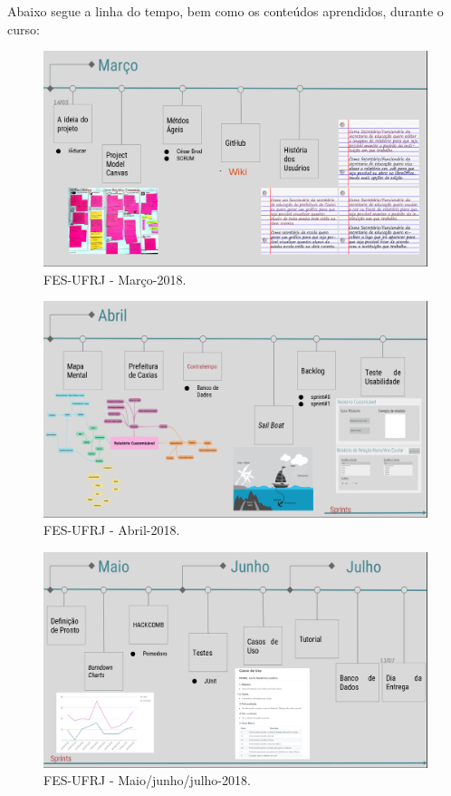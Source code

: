 Abaixo segue a linha do tempo, bem como os conteúdos aprendidos, durante o curso:

\begin{figure}
    \centering
    \includegraphics[width=.9\textwidth]{chaps/Images/Linha-tempo1.png}
    \caption{FES-UFRJ - Março-2018.}
    \label{fig:linha-dotempo1}
\end{figure}

\begin{figure}
    \centering
    \includegraphics[width=.9\textwidth]{chaps/Images/linha-tempo2.png}
    \caption{FES-UFRJ - Abril-2018.}
    \label{fig:linha-dotempo2}
\end{figure}

\begin{figure}
    \centering
    \includegraphics[width=.9\textwidth]{chaps/Images/maio.png}
    \caption{FES-UFRJ - Maio/junho/julho-2018.}
    \label{fig:linha-dotempo3}
\end{figure}


